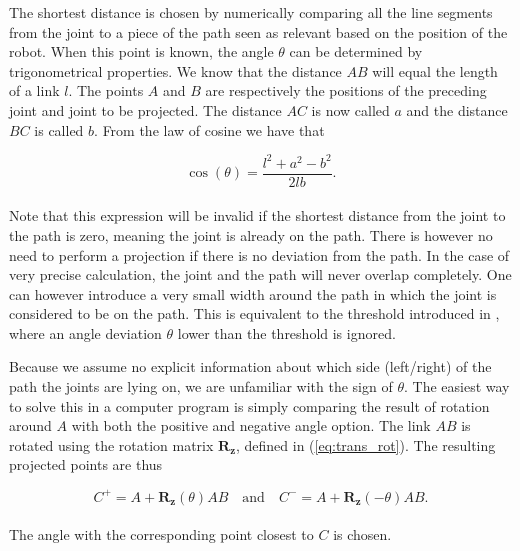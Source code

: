 The shortest distance is chosen by numerically comparing all the line segments from the joint to a piece of the path seen as relevant based on the position of the robot. When this point is known, the angle $\theta$ can be determined by trigonometrical properties. We know that the distance $AB$ will equal the length of a link $l$. The points $A$ and $B$ are respectively the positions of the preceding joint and joint to be projected. The distance $AC$ is now called $a$ and the distance $BC$ is called $b$. From the law of cosine we have that

\begin{equation}
    \cos{(\theta)} = \frac{l^2 + a^2 - b^2}{2lb}.
\end{equation}
\\
Note that this expression will be invalid if the shortest distance from the joint to the path is zero, meaning the joint is already on the path. There is however no need to perform a projection if there is no deviation from the path. In the case of very precise calculation, the joint and the path will never overlap completely. One can however introduce a very small width around the path in which the joint is considered to be on the path. This is equivalent to the threshold introduced in \cite{conkur2008path}, where an angle deviation $\theta$ lower than the threshold is ignored.

Because we assume no explicit information about which side (left/right) of the path the joints are lying on, we are unfamiliar with the sign of $\theta$. The easiest way to solve this in a computer program is simply comparing the result of rotation around $A$ with both the positive and negative angle option. The link $AB$ is rotated using the rotation matrix $\mathbf{R_z}$, defined in (\ref{eq:trans_rot}). The resulting projected points are thus

\begin{equation}
    C^+ = A + \mathbf{R_z}(\theta)AB \quad \text{and} \quad
    C^- = A + \mathbf{R_z}(-\theta)AB.
\end{equation}
\\
The angle with the corresponding point closest to $C$ is chosen.



